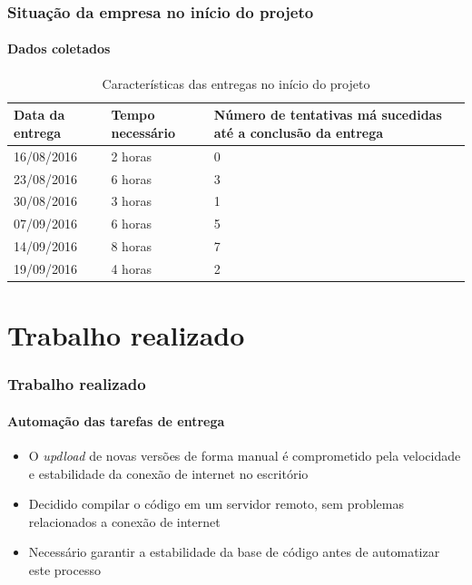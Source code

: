 \documentclass[aspectratio=169]{beamer}
\begin{document}
\begin{frame}
	
	\frametitle{Situação da empresa no início do projeto}
	\framesubtitle{Dados coletados}
	
	\begin{table}[htb]
		\caption{Características das entregas no início do projeto}
		
		\label{tab-deploys}	
		\begin{tabular}{p{3.5cm}|p{3.5cm}|p{5.50cm}}
			\textbf{Data da entrega} & \textbf{Tempo necessário} & \textbf{Número de tentativas má sucedidas até a conclusão da entrega}  \\
			\hline
			16/08/2016 & 2 horas & 0 \\
			\hline
			23/08/2016 & 6 horas & 3 \\
			\hline
			30/08/2016 & 3 horas & 1 \\
			\hline
			07/09/2016 & 6 horas & 5 \\
			\hline
			14/09/2016 & 8 horas & 7 \\
			\hline
			19/09/2016 & 4 horas & 2 \\
		\end{tabular}
	\end{table}
	
\end{frame}


\section{Trabalho realizado}

\begin{frame}
	\frametitle{Trabalho realizado}
	\framesubtitle{Automação das tarefas de entrega}
	
	\begin{itemize}
		 \item O \textit{updload} de novas versões de forma manual é comprometido pela velocidade e estabilidade da conexão de internet no escritório

		 \item Decidido compilar o código em um servidor remoto, sem problemas relacionados a conexão de internet
		 
		 \item Necessário garantir a estabilidade da base de código antes de automatizar este processo
	\end{itemize}

\end{frame}
\end{document}
